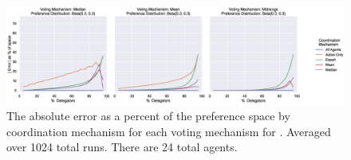 \begin{landscape}
    \begin{figure}[p]
        \centering
        \includegraphics[scale=0.55]
        {content/chapter2/figures/distributions/Beta_0.3_0.3_error_as_percent_of_space_abs_mean}
        \caption{
            The absolute error as a percent of the preference space by coordination
            mechanism for each voting mechanism for .
            Averaged over 1024 total runs.
            There are 24 total agents.
        }
        \label{fig:beta-.3-.3-error-as-percent-of-space-abs-mean}
    \end{figure}
\end{landscape}